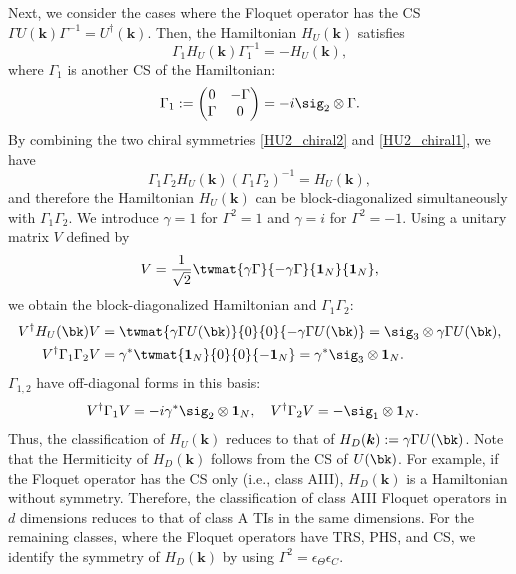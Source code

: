 \documentclass[
floatfix,
pra,
twocolumn,
reprint,
amsmath,amssymb,
aps,
footnote,
]{revtex4}
\begin{document}
Next, we consider the cases where the Floquet operator has the CS $\Gamma U(\bm{k})\Gamma^{-1}=U^\dag (\bm{k})$. Then, the Hamiltonian $H_U(\bm{k})$ satisfies
\begin{equation}
\Gamma_1 H_U(\bm{k})\Gamma_1^{-1}=-H_U(\bm{k})
, \label{HU2_chiral1}
\end{equation}
where $\Gamma_1$ is another CS of the Hamiltonian:
\begin{equation}
\Gamma_1:=
\begin{pmatrix}
0 & -\Gamma\\
\Gamma & 0
\end{pmatrix}
 = -i \sig_2 \otimes \Gamma
.
\end{equation}
By combining the two chiral symmetries \eqref{HU2_chiral2} and \eqref{HU2_chiral1}, we have
\begin{equation}
\Gamma_1\Gamma_2H_U(\bm{k})(\Gamma_1\Gamma_2)^{-1}=H_U(\bm{k})
,
\end{equation}
and therefore the Hamiltonian $H_U(\bm{k})$ can be block-diagonalized simultaneously with $\Gamma_1\Gamma_2$.
We introduce $\gamma=1$ for $\Gamma^2=1$ and $\gamma=i$ for $\Gamma^2=-1$.
Using a unitary matrix $V$ defined by
\begin{align}
	V = {1 \over \sqrt{2}} \twmat{\gamma \Gamma}{-\gamma \Gamma}{\bm{1}_N}{\bm{1}_N}
	,
\end{align}
we obtain the block-diagonalized Hamiltonian and $\Gamma_1\Gamma_2$:
\begin{align}
	V^\dag H_U(\bk)V &= \twmat{\gamma \Gamma U(\bk)}{0}{0}{-\gamma \Gamma U(\bk)}
	 = \sig_3 \otimes \gamma\Gamma U(\bk)
	, \\
	V^\dag \Gamma_1\Gamma_2 V &= \gamma^*\twmat{\bm{1}_N}{0}{0}{ -\bm{1}_N}
	 = \gamma^* \sig_3 \otimes \bm{1}_N
	.
\end{align}
$\Gamma_{1,2}$ have off-diagonal forms in this basis:
\begin{align}
	V^\dag \Gamma_1 V &
	 = -i \gamma^* \sig_2 \otimes \bm{1}_N
	, \quad
	V^\dag \Gamma_2 V
	 = - \sig_1 \otimes \bm{1}_N
	.
\end{align}
Thus, the classification of $H_U(\bm{k})$ reduces to that of $H_D(\bm{k}) := \gamma \Gamma U(\bk)$.
Note that the Hermiticity of $H_D(\bm{k})$ follows from the CS of $U(\bk)$.
For example, if the Floquet operator has the CS only (i.e., class AIII), $H_D(\bm{k})$ is a Hamiltonian without symmetry.
Therefore, the classification of class AIII Floquet operators in $d$ dimensions reduces to that of class A TIs in the same dimensions.
For the remaining classes, where the Floquet operators have TRS, PHS, and CS, we identify the symmetry of $H_D(\bm{k})$ by using $\Gamma^2=\epsilon_\Theta\epsilon_C$.
\end{document}
